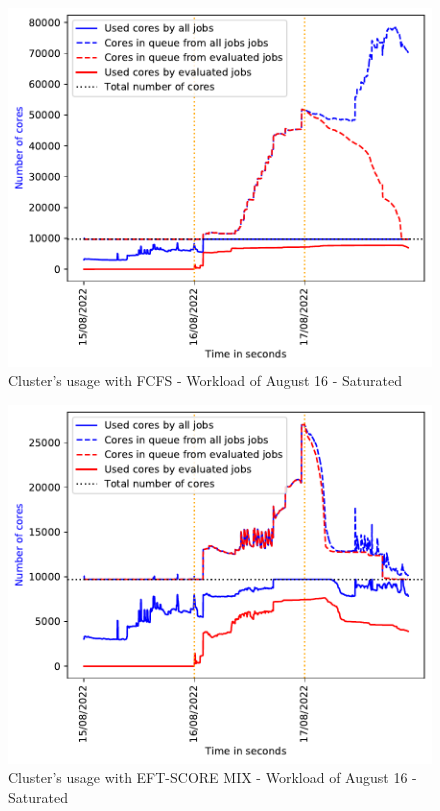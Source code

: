 \documentclass[conference,10pt]{IEEEtran}
\begin{document}
\begin{figure}\centering\includegraphics[width=1\linewidth]{../MBSS/plot/2022-08-16->2022-08-16_V10000_Fcfs_Used_nodes_Reduced_450_128_32_256_4_1024.pdf}\caption{Cluster's usage with FCFS - Workload of August 16 - Saturated}\end{figure}
\begin{figure}\centering\includegraphics[width=1\linewidth]{../MBSS/plot/2022-08-16->2022-08-16_V10000_Fcfs_with_a_score_mixed_strategy_x500_x1_x0_x0_Used_nodes_Reduced_450_128_32_256_4_1024.pdf}\caption{Cluster's usage with EFT-SCORE MIX - Workload of August 16 - Saturated}\end{figure}
\end{document}
